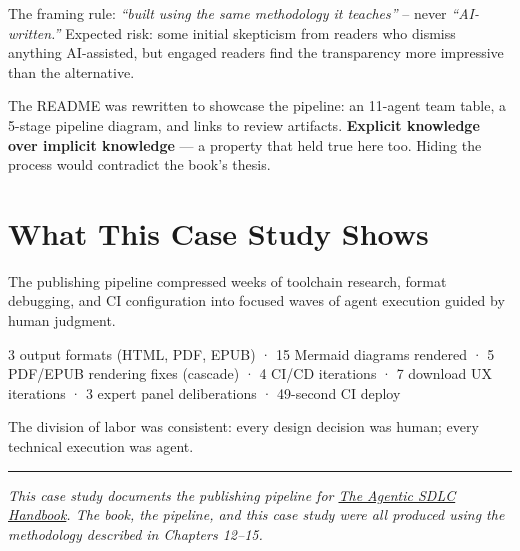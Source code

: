 \documentclass[
  a4paper,
  DIV=11,
  numbers=noendperiod]{scrreprt}
\begin{document}
The framing rule: \emph{``built using the same methodology it teaches''}
-- never \emph{``AI-written.''} Expected risk: some initial skepticism
from readers who dismiss anything AI-assisted, but engaged readers find
the transparency more impressive than the alternative.

The README was rewritten to showcase the pipeline: an 11-agent team
table, a 5-stage pipeline diagram, and links to review artifacts.
\textbf{Explicit knowledge over implicit knowledge} --- a property that
held true here too. Hiding the process would contradict the book's
thesis.

\section{What This Case Study Shows}\label{what-this-case-study-shows}

The publishing pipeline compressed weeks of toolchain research, format
debugging, and CI configuration into focused waves of agent execution
guided by human judgment.

\begin{tcolorbox}[enhanced jigsaw, arc=.35mm, bottomrule=.15mm, bottomtitle=1mm, breakable, colback=white, colbacktitle=quarto-callout-note-color!10!white, colframe=quarto-callout-note-color-frame, coltitle=black, left=2mm, leftrule=.75mm, opacityback=0, opacitybacktitle=0.6, rightrule=.15mm, title=\textcolor{quarto-callout-note-color}{\faInfo}\hspace{0.5em}{Metrics}, titlerule=0mm, toprule=.15mm, toptitle=1mm]

3 output formats (HTML, PDF, EPUB) · 15 Mermaid diagrams rendered · 5
PDF/EPUB rendering fixes (cascade) · 4 CI/CD iterations · 7 download UX
iterations · 3 expert panel deliberations · 49-second CI deploy

\end{tcolorbox}

The division of labor was consistent: every design decision was human;
every technical execution was agent.

\begin{center}\rule{0.5\linewidth}{0.5pt}\end{center}

\emph{This case study documents the publishing pipeline for
\href{https://danielmeppiel.github.io/apm-handbook/}{The Agentic SDLC
Handbook}. The book, the pipeline, and this case study were all produced
using the methodology described in Chapters 12--15.}
\end{document}
